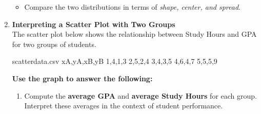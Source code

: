 \documentclass{article}
\begin{document}
\begin{enumerate}
\begin{center}
\end{center}

\begin{itemize}
  \item Compare the two distributions in terms of \emph{shape, center, and spread}.  
\end{itemize}
\item \textbf{Interpreting a Scatter Plot with Two Groups} \\
The scatter plot below shows the relationship between Study Hours and GPA for two groups of students.

\begin{filecontents*}{scatterdata.csv}
xA,yA,xB,yB
1,4,1,3
2,5,2,4
3,4,3,5
4,6,4,7
5,5,5,9
\end{filecontents*}


\begin{center}
\end{center}

\textbf{Use the graph to answer the following:}
\begin{enumerate}
    \item Compute the \textbf{average GPA} and \textbf{average Study Hours} for each group. Interpret these averages in the context of student performance.
    

\end{enumerate}
\end{enumerate}
\end{document}
